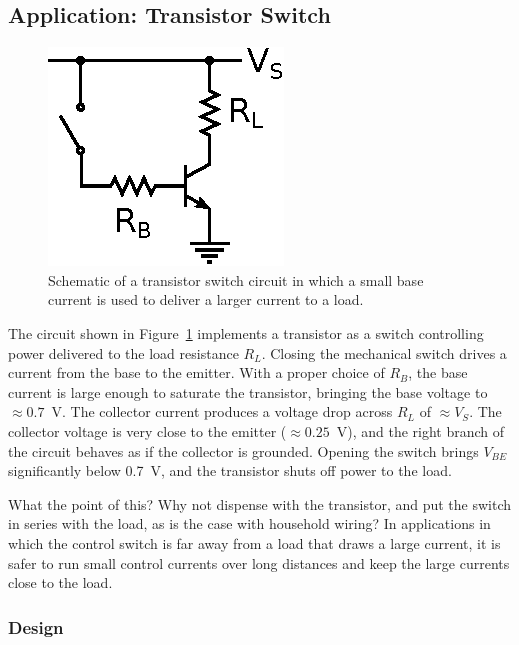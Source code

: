 \documentclass[11pt]{article}
\begin{document}
\subsection{Application: Transistor Switch}
\label{sec:transistorswitch}

\begin{figure}[ht]
  \begin{center}
    \includegraphics{transistorswitch.eps}
    \caption{Schematic of a transistor switch circuit in which a small
      base current is used to deliver a larger current to a load.}
    \label{fig:transistorswitch}
  \end{center}
\end{figure}

The circuit shown in Figure~\ref{fig:transistorswitch} implements a
transistor as a switch controlling power delivered to the load
resistance $R_L$.  Closing the mechanical switch drives a current from
the base to the emitter.  With a proper choice of $R_B$, the base
current is large enough to saturate the transistor, bringing the base
voltage to $\approx0.7$~V.  The collector current produces a voltage
drop across $R_L$ of $\approx V_S$. The collector voltage is very close to
the emitter ($\approx 0.25$~V), and the right branch of the circuit
behaves as if the collector is grounded. Opening the switch
brings $V_{BE}$ significantly below 0.7~V, and the transistor shuts
off power to the load.

What the point of this? Why not dispense with the transistor, and put
the switch in series with the load, as is the case with household
wiring? In applications in which the control switch is far away from a
load that draws a large current, it is safer to run small 
control currents over long distances and keep the large currents close
to the load.

\subsubsection*{Design}
\end{document}
